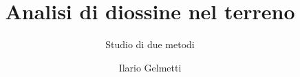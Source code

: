 \documentclass{beamer}
\title{Analisi di diossine nel terreno}
\subtitle{Studio di due metodi}
\author{Ilario Gelmetti}
\institute{Dipartimento di Chimica e Chimica Industriale - Università di Pisa}
\begin{document}
\begin{frame}
  \titlepage
\end{frame}








\end{document}
